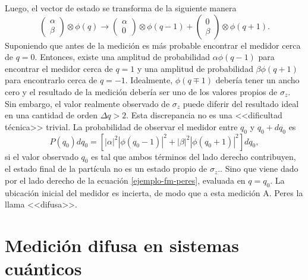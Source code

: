 Luego, el vector de estado se transforma de la siguiente manera\begin{equation}\label{ejemplo-fm-peres}
    \begin{pmatrix}\alpha\\\beta\end{pmatrix}\otimes \phi(q)\to \begin{pmatrix}\alpha\\0\end{pmatrix}\otimes \phi(q-1)+\begin{pmatrix}0\\\beta\end{pmatrix}\otimes \phi(q+1).
\end{equation}Suponiendo que antes de la medición es más probable encontrar el medidor cerca de $q = 0$. Entonces, existe una amplitud de probabilidad $\alpha\phi(q-1)$ para encontrar el medidor cerca de $q = 1$ y una amplitud de probabilidad $\beta \phi(q + 1)$ para encontrarlo cerca de $q = -1$.
Idealmente, $\phi(q\mp 1)$ debería tener un ancho cero y el resultado de la medición debería ser uno de los valores propios de $\sigma_z$.   Sin embargo, el valor realmente observado de $\sigma_z$ puede diferir del resultado ideal en una cantidad de orden $\Delta q>2$. Esta discrepancia no es una <<dificultad técnica>> trivial. La probabilidad de observar el medidor entre $q_0$ y $q_0 + d q_0$
es\[P(q_0)dq_0=[|\alpha|^2|\phi(q_0-1)|^2+|\beta|^2|\phi(q_0+1)|^2]dq_0,\]si el
valor observado $q_0$ es tal que ambos términos del lado derecho contribuyen,
el estado final de la partícula no es un estado propio de $\sigma_z$.. Sino que viene dado por el lado derecho de la ecuación {\eqref{ejemplo-fm-peres}}, evaluada en $q = q_0$. La
ubicación inicial del medidor es incierta, de modo que a esta medición A. Peres la llama <<difusa>>.   


\section{Medición difusa en sistemas cuánticos}

